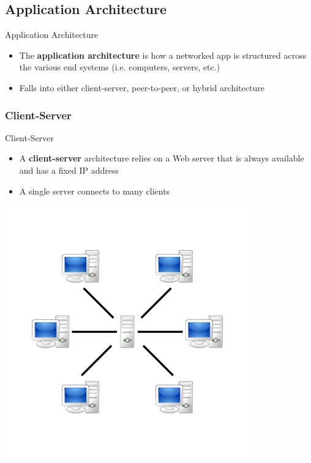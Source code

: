 \documentclass{beamer}
\begin{document}
    \subsection{Application Architecture}

    \begin{frame}{Application Architecture}
        \begin{itemize}
            \item The \textbf{application architecture} is how a networked app is structured across the various end systems (i.e. computers, servers, etc.) \cite{kurose}
            \item Falls into either client-server, peer-to-peer, or hybrid architecture
        \end{itemize}
    \end{frame}
       
       
        \subsubsection{Client-Server}
        \begin{frame}{Client-Server}
            \begin{itemize}
                \item A \textbf{client-server} architecture relies on a Web server that is always available and has a fixed IP address\\
                \item A single server connects to many clients
            \end{itemize}
            \centering
            \includegraphics[scale=0.5]{Server-based-network.png}
        \end{frame}
       
\end{document}
